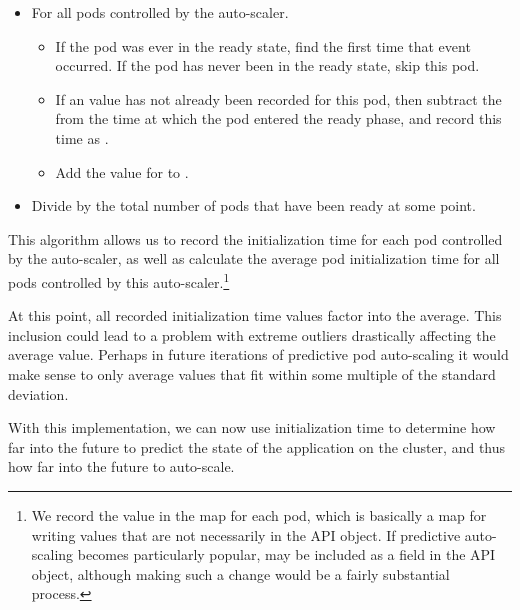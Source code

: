 \begin{itemize}
  \item For all pods controlled by the auto-scaler.
    \begin{itemize}
      \item If the pod was ever in the ready state, find the first time that
        event occurred. If the pod has never been in the ready state, skip this pod.
      \item If an  value has not already been recorded for
        this pod, then subtract the  from the time at which the
        pod entered the ready phase, and record this time as
        .
      \item Add the value for  to
        .
      \end{itemize}
    \item Divide  by the total number of pods that
      have been ready at some point.
\end{itemize}

This algorithm allows us to record the initialization time for each pod
controlled by the auto-scaler, as well as calculate the average pod
initialization time for all pods controlled by this auto-scaler.\footnote{We
record the value in the  map for each pod,
which is basically a map for writing
values that are not necessarily in the  API object. If predictive
auto-scaling becomes particularly popular,  may be
included as a field in the  API object, although making such a change would
be a fairly substantial process.}

At this point, all recorded initialization time values factor into the average.
This inclusion could lead to a problem with extreme outliers drastically
affecting the average value. Perhaps in future iterations of predictive pod
auto-scaling it would make sense to only average values that fit within some
multiple of the standard deviation.

With this implementation, we can now use initialization time to determine how
far into the future to predict the state of the application on the cluster, and
thus how far into the future to auto-scale.
